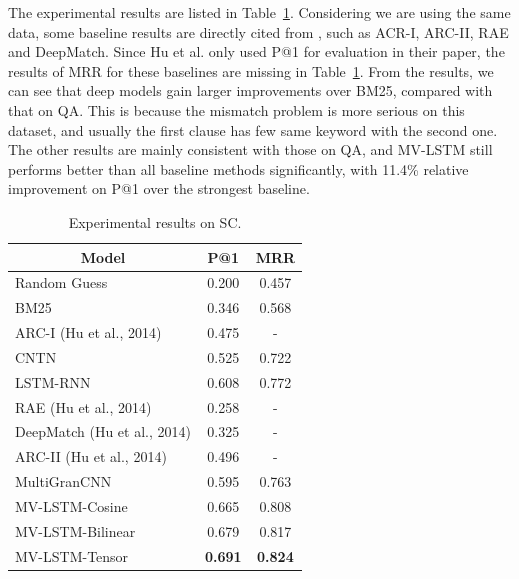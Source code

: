 \documentclass[letterpaper]{article}
\begin{document}
The experimental results are listed in Table~\ref{tb:sc}. Considering we are using the same data, some baseline results are directly cited from \cite{DBLP:conf/nips/HuLLC14}, such as ACR-I, ARC-II, RAE and DeepMatch. Since Hu et al. only used P@1 for evaluation in their paper, the results of MRR for these baselines are missing in Table~\ref{tb:sc}.
From the results, we can see that deep models gain larger improvements over BM25, compared with that on QA. This is because the mismatch problem is more serious on this dataset, and usually the first clause has few same keyword with the second one. The other results are mainly consistent with those on QA, and MV-LSTM still performs better than all baseline methods significantly, with 11.4\% relative improvement on P@1 over the strongest baseline.
\begin{table}[t]
\centering
\caption{Experimental results on SC.}
\label{tb:sc}
\begin{tabular}{lcc} \hline
\multicolumn{1}{c}{Model}   & P@1 & MRR \\ \hline
Random Guess 				& 0.200 & 0.457 \\
BM25					 	& 0.346 & 0.568 \\ \hline
ARC-I (Hu et al., 2014)		& 0.475 & - \\
CNTN						& 0.525 & 0.722 \\
LSTM-RNN 					& 0.608 & 0.772 \\ \hline
RAE	(Hu et al., 2014)		& 0.258 & - \\
DeepMatch (Hu et al., 2014)	& 0.325 & - \\
ARC-II (Hu et al., 2014)	    & 0.496 & - \\
MultiGranCNN 					& 0.595 & 0.763 \\ \hline
MV-LSTM-Cosine					& 0.665 & 0.808 \\
MV-LSTM-Bilinear			& 0.679 & 0.817 \\
MV-LSTM-Tensor 				& \textbf{0.691} & \textbf{0.824} \\
\hline
\end{tabular}
\end{table}
\end{document}
